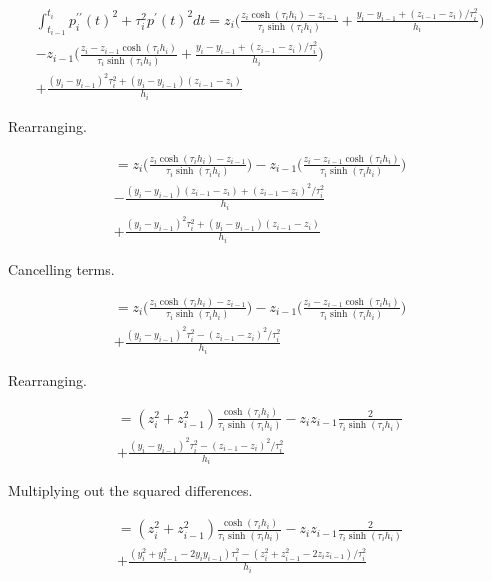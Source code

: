 \documentclass{article}
\begin{document}
\begin{multline}
    \int_{t_{i - 1}}^{t_i}p^{\prime\prime}_i(t)^2 + \tau_i^2 p^{\prime}(t)^2 dt
    = z_i\biggl( \frac{ z_i \cosh(\tau_i h_i) -z_{i-1} }{\tau_i \sinh(\tau_i h_i)}
    + \frac{y_i - y_{i-1} +  (z_{i-1} - z_i)/\tau_i^2}{h_i} \biggr) \\
    - z_{i-1} \biggl(\frac{ z_i - z_{i-1} \cosh(\tau_i h_i) }{\tau_i \sinh(\tau_i h_i)}
    + \frac{y_i - y_{i-1} +  (z_{i-1} - z_i)/\tau_i^2}{h_i} \biggr) \\
    + \frac{(y_i - y_{i-1})^2\tau_i^2 + (y_i - y_{i-1})(z_{i-1} - z_i)}{h_i} 
\end{multline}

Rearranging.

\begin{multline}
    = z_i\biggl( \frac{ z_i \cosh(\tau_i h_i) -z_{i-1} }{\tau_i \sinh(\tau_i h_i)} \biggr)
    - z_{i-1} \biggl(\frac{ z_i - z_{i-1} \cosh(\tau_i h_i) }{\tau_i \sinh(\tau_i h_i)} \biggr) \\
    - \frac{(y_i - y_{i-1})(z_{i-1} - z_i) +  (z_{i-1} - z_i)^2/\tau_i^2}{h_i}  \\
    + \frac{(y_i - y_{i-1})^2\tau_i^2 + (y_i - y_{i-1})(z_{i-1} - z_i)}{h_i} 
\end{multline}

Cancelling terms.

\begin{multline}
    = z_i\biggl( \frac{ z_i \cosh(\tau_i h_i) -z_{i-1} }{\tau_i \sinh(\tau_i h_i)} \biggr)
    - z_{i-1} \biggl(\frac{ z_i - z_{i-1} \cosh(\tau_i h_i) }{\tau_i \sinh(\tau_i h_i)} \biggr) \\
    + \frac{(y_i - y_{i-1})^2\tau_i^2 - (z_{i-1} - z_i)^2/\tau_i^2 }{h_i} 
\end{multline}

Rearranging.

\begin{multline}
    = (z_i^2 + z_{i-1}^2) \frac{\cosh(\tau_i h_i)}{\tau_i \sinh(\tau_i h_i)}
    -z_i z_{i-1} \frac{2}{\tau_i \sinh(\tau_i h_i)} \\
    + \frac{(y_i - y_{i-1})^2\tau_i^2 - (z_{i-1} - z_i)^2/\tau_i^2 }{h_i} 
\end{multline}

Multiplying out the squared differences.

\begin{multline}
    = (z_i^2 + z_{i-1}^2) \frac{\cosh(\tau_i h_i)}{\tau_i \sinh(\tau_i h_i)}
    -z_i z_{i-1} \frac{2}{\tau_i \sinh(\tau_i h_i)} \\
    + \frac{(y_i^2 + y_{i-1}^2 -2 y_i y_{i-1} )\tau_i^2 - (z_i^2 + z_{i-1}^2 - 2 z_i z_{i-1} )/\tau_i^2 }{h_i} 
\end{multline}
\end{document}

